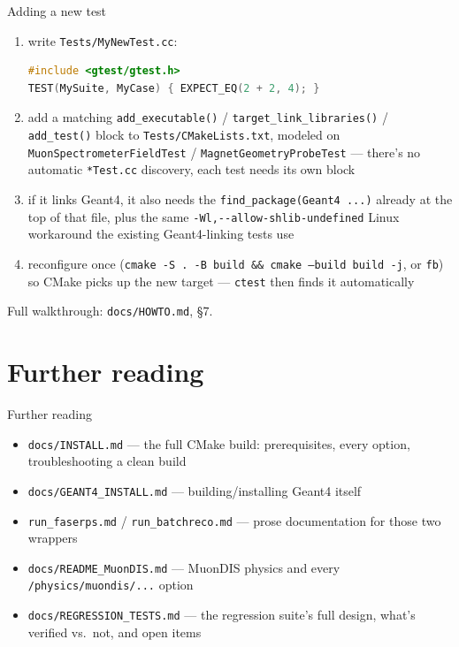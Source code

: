 \documentclass[aspectratio=169]{beamer}
\begin{document}
\begin{frame}[fragile]{Adding a new test}
  \footnotesize
  \begin{enumerate}
    \item write \texttt{Tests/MyNewTest.cc}:
\begin{lstlisting}[language=C++,basicstyle=\ttfamily\scriptsize]
#include <gtest/gtest.h>
TEST(MySuite, MyCase) { EXPECT_EQ(2 + 2, 4); }
\end{lstlisting}
    \item add a matching \texttt{add\_executable()} /
      \texttt{target\_link\_libraries()} / \texttt{add\_test()} block to
      \texttt{Tests/CMakeLists.txt}, modeled on
      \texttt{MuonSpectrometerFieldTest} / \texttt{MagnetGeometryProbeTest}
      --- there's no automatic \texttt{*Test.cc} discovery, each test needs
      its own block
    \item if it links Geant4, it also needs the
      \texttt{find\_package(Geant4 ...)} already at the top of that file,
      plus the same \texttt{-Wl,-{}-allow-shlib-undefined} Linux workaround
      the existing Geant4-linking tests use
    \item reconfigure once (\texttt{cmake -S . -B build \&\& cmake --build
      build -j}, or \texttt{fb}) so CMake picks up the new target ---
      \texttt{ctest} then finds it automatically
  \end{enumerate}
  \vspace{0.2cm}
  \footnotesize Full walkthrough: \texttt{docs/HOWTO.md}, \S7.
\end{frame}

\section{Further reading}

\begin{frame}{Further reading}
  \begin{itemize}
    \item \texttt{docs/INSTALL.md} --- the full CMake build: prerequisites,
      every option, troubleshooting a clean build
    \item \texttt{docs/GEANT4\_INSTALL.md} --- building/installing Geant4
      itself
    \item \texttt{run\_faserps.md} / \texttt{run\_batchreco.md} --- prose
      documentation for those two wrappers
    \item \texttt{docs/README\_MuonDIS.md} --- MuonDIS physics and every
      \texttt{/physics/muondis/...} option
    \item \texttt{docs/REGRESSION\_TESTS.md} --- the regression suite's
      full design, what's verified vs.\ not, and open items
  \end{itemize}
\end{frame}
\end{document}
